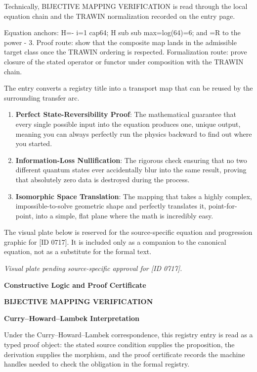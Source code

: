 Technically, BIJECTIVE MAPPING VERIFICATION is read through the local equation chain and the TRAWIN normalization recorded on the entry page.

Equation anchors: H=- i=1 cap64; H sub sub max=log(64)=6; and =R to the power - 3. Proof route: show that the composite map lands in the admissible target class once the TRAWIN ordering is respected. Formalization route: prove closure of the stated operator or functor under composition with the TRAWIN chain.

The entry converts a registry title into a transport map that can be reused by the surrounding transfer arc.
\endgroup

\begin{enumerate}[leftmargin=1.6em,itemsep=6pt,topsep=4pt]
\item \textbf{Perfect State-Reversibility Proof}: The mathematical guarantee that every single possible input into the equation produces one, unique output, meaning you can always perfectly run the physics backward to find out where you started.
\item \textbf{Information-Loss Nullification}: The rigorous check ensuring that no two different quantum states ever accidentally blur into the same result, proving that absolutely zero data is destroyed during the process.
\item \textbf{Isomorphic Space Translation}: The mapping that takes a highly complex, impossible-to-solve geometric shape and perfectly translates it, point-for-point, into a simple, flat plane where the math is incredibly easy.
\end{enumerate}

\begingroup\footnotesize\sloppy
The visual plate below is reserved for the source-specific equation and progression graphic for [ID 0717]. It is included only as a companion to the canonical equation, not as a substitute for the formal text.
\par\endgroup
\begingroup\footnotesize\itshape
Visual plate pending source-specific approval for [ID 0717].
\par\endgroup

\clearpage
\begingroup\tzpsupportsetup
\noindent\textbf{\fontsize{10.8pt}{12.8pt}\selectfont [ID 0717] Constructive Logic and Proof Certificate}\par
\noindent\textbf{\fontsize{10pt}{12pt}\selectfont BIJECTIVE MAPPING VERIFICATION}\par
\vspace{0.45em}
\begingroup
\footnotesize
\setlength{\parskip}{0.22em}
\setlength{\parindent}{0pt}
\noindent\textbf{Curry--Howard--Lambek Interpretation}\par
Under the Curry--Howard--Lambek correspondence, this registry entry is read as a typed proof
object: the stated source condition supplies the proposition, the derivation supplies the
morphism, and the proof certificate records the machine handles needed to check the obligation
in the formal registry.

